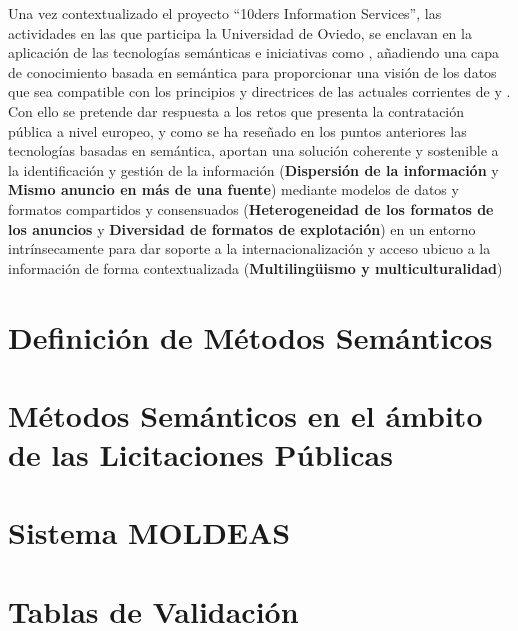 \documentclass[a4paper,twoside,12pt]{report}
\begin{document}
Una vez contextualizado el proyecto ``10ders Information Services'', las actividades en las que 
participa la Universidad de Oviedo, se enclavan en la aplicación de las tecnologías semánticas
e iniciativas como \linkeddata, añadiendo una capa de conocimiento basada en semántica para proporcionar
una visión de los datos que sea compatible con los principios y directrices de las 
actuales corrientes de \opendata y \linkeddata. Con ello se pretende dar respuesta a los retos
que presenta la contratación pública a nivel europeo, y como se ha reseñado en los puntos anteriores las tecnologías
basadas en semántica, aportan una solución coherente y sostenible a la identificación y gestión de la información 
(\textbf{Dispersión de la información} y \textbf{Mismo anuncio en más de una fuente}) mediante modelos de datos y formatos
compartidos y consensuados (\textbf{Heterogeneidad de los formatos de los anuncios} y \textbf{Diversidad de formatos de explotación}) en un entorno
intrínsecamente para dar soporte a la internacionalización y acceso ubicuo a la información de forma
contextualizada (\textbf{Multilingüismo y multiculturalidad})

\chapter{\label{capitulo:metodos}Definición de Métodos Semánticos} %

\chapter{\label{capitulo:metodos-separados}Métodos Semánticos en el ámbito de las Licitaciones Públicas} %

\chapter{\label{capitulo:moldeas}Sistema MOLDEAS} %

\appendix
\chapter{\label{capitulo:tablas}Tablas de Validación}\label{tablas-validacion-apen}


\printindex
\printglossaries


\insertbibliography
\end{document}
